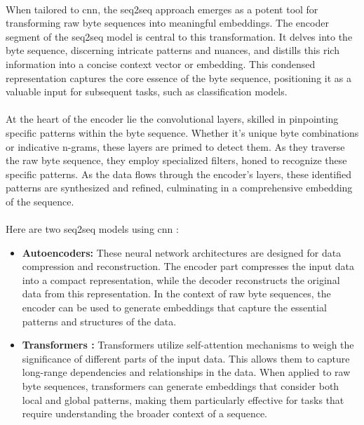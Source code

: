         \paragraph{}When tailored to \acrshort{cnn}, the \acrfull{seq2seq}\cite{gehring_convolutional_2017} approach emerges as a potent tool for transforming raw byte sequences into meaningful embeddings. The encoder segment of the \acrshort{seq2seq} model is central to this transformation. It delves into the byte sequence, discerning intricate patterns and nuances, and distills this rich information into a concise context vector or embedding. This condensed representation captures the core essence of the byte sequence, positioning it as a valuable input for subsequent tasks, such as classification models.

        \paragraph{}At the heart of the encoder lie the convolutional layers, skilled in pinpointing specific patterns within the byte sequence. Whether it's unique byte combinations or indicative n-grams, these layers are primed to detect them. As they traverse the raw byte sequence, they employ specialized filters, honed to recognize these specific patterns. As the data flows through the encoder's layers, these identified patterns are synthesized and refined, culminating in a comprehensive embedding of the sequence.

        \paragraph{}Here are two \acrfull{seq2seq} models using \acrshort{cnn} :
        

        \begin{itemize}
            \item \textbf{Autoencoders:} These neural network architectures\cite{hinton_reducing_2006} are designed for data compression and reconstruction. The encoder part compresses the input data into a compact representation, while the decoder reconstructs the original data from this representation. In the context of raw byte sequences, the encoder can be used to generate embeddings that capture the essential patterns and structures of the data.

            \item \textbf{Transformers :} Transformers\cite{vaswani_attention_2017} utilize self-attention mechanisms to weigh the significance of different parts of the input data. This allows them to capture long-range dependencies and relationships in the data. When applied to raw byte sequences, transformers can generate embeddings that consider both local and global patterns, making them particularly effective for tasks that require understanding the broader context of a sequence.

        \end{itemize}
        
